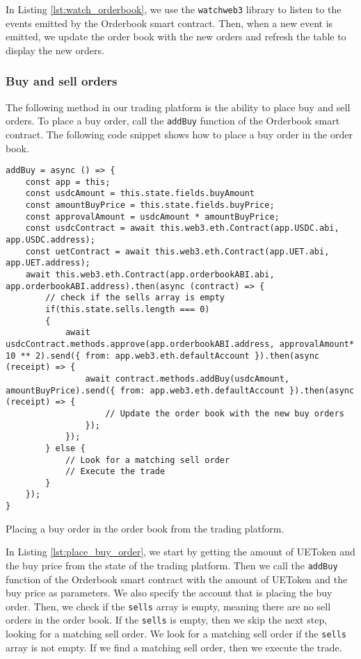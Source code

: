 In Listing \ref{lst:watch_orderbook}, we use the \texttt{watchweb3} library to listen to the events emitted by the Orderbook smart contract. Then, when a new event is
emitted, we update the order book with the new orders and refresh the table to display the new orders.


\subsubsection{Buy and sell orders}


The following method in our trading platform is the ability to place buy and sell orders. To place a buy order, call the \texttt{addBuy} function of the Orderbook
smart contract. The following code snippet shows how to place a buy order in the order book.

\begin{listing}[H]
    \begin{verbatim}
addBuy = async () => {
    const app = this;
    const usdcAmount = this.state.fields.buyAmount
    const amountBuyPrice = this.state.fields.buyPrice;
    const approvalAmount = usdcAmount * amountBuyPrice;
    const usdcContract = await this.web3.eth.Contract(app.USDC.abi, app.USDC.address);
    const uetContract = await this.web3.eth.Contract(app.UET.abi, app.UET.address);
    await this.web3.eth.Contract(app.orderbookABI.abi, app.orderbookABI.address).then(async (contract) => {
        // check if the sells array is empty
        if(this.state.sells.length === 0)
        {
            await usdcContract.methods.approve(app.orderbookABI.address, approvalAmount* 10 ** 2).send({ from: app.web3.eth.defaultAccount }).then(async (receipt) => {
                await contract.methods.addBuy(usdcAmount, amountBuyPrice).send({ from: app.web3.eth.defaultAccount }).then(async (receipt) => {
                    // Update the order book with the new buy orders
                });
            });
        } else {
            // Look for a matching sell order
            // Execute the trade
        }
    });
}
    \end{verbatim}
    \caption{Placing a buy order in the order book from the trading platform.}
    \label{lst:place_buy_order}
\end{listing}

In Listing \ref{lst:place_buy_order}, we start by getting the amount of UEToken and the buy price from the state of the trading platform. Then we call the
\texttt{addBuy} function of the Orderbook smart contract with the amount of UEToken and the buy price as parameters. We also specify the account that is
placing the buy order. Then, we check if the \texttt{sells} array is empty, meaning there are no sell orders in the order book. If the \texttt{sells}
is empty, then we skip the next step, looking for a matching sell order. We look for a matching sell order if the \texttt{sells} array is not empty. If we find a matching sell order, then we execute the trade.


